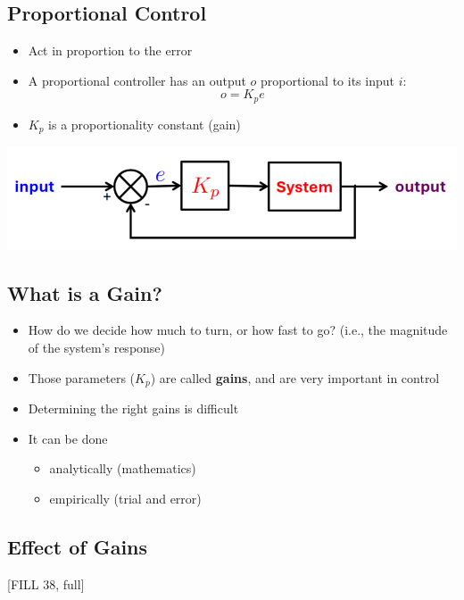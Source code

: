 \documentclass[10pt]{article}
\begin{document}
\subsection*{Proportional Control}
\begin{itemize}
	\item Act in proportion to the error
	\item A proportional controller has an output $o$ proportional to its input $i$:
	\[o = K_p e\]
    \item $K_p$ is a proportionality constant (gain)
\end{itemize}
\begin{center} 
	\includegraphics*[width=\textwidth]{L2_9.png}
\end{center}

\subsection*{What is a Gain?}
\begin{itemize}
	\item How do we decide how much to turn, or how fast to go?  (i.e., the magnitude of the system's response)
	\item Those parameters ($K_p$) are called \textbf{gains}, and are very important in control
	\item Determining the right gains is difficult
	\item It can be done
	\begin{itemize}
        \item analytically (mathematics)
        \item empirically (trial and error)
    \end{itemize}
\end{itemize}

\subsection*{Effect of Gains}
[FILL 38, full]
\end{document}
